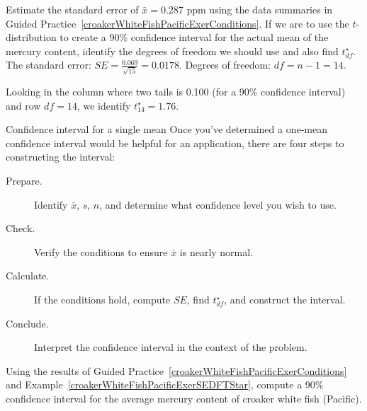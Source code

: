 \begin{examplewrap}
\begin{nexample}{Estimate the standard error of $\bar{x}=0.287$ ppm using the data summaries in Guided Practice~\ref{croakerWhiteFishPacificExerConditions}. If we are to use the $t$-distribution to create a 90\% confidence interval for the actual mean of the mercury content, identify the degrees of freedom we should use and also find $t^{\star}_{df}$.}
\label{croakerWhiteFishPacificExerSEDFTStar}
The standard error: $SE = \frac{0.069}{\sqrt{15}} = 0.0178$. Degrees of freedom: $df = n - 1 = 14$.

Looking in the column where two tails is 0.100 (for a 90\% confidence interval) and row $df=14$, we identify $t^{\star}_{14} = 1.76$.
\end{nexample}
\end{examplewrap}

\begin{onebox}{Confidence interval for a single mean}
  Once you've determined a one-mean confidence interval
  would be helpful for an application,
  there are four steps to constructing the interval:
  \begin{description}
  \item[Prepare.]
      Identify $\bar{x}$, $s$, $n$, and determine what
      confidence level you wish to use.
  \item[Check.]
      Verify the conditions to ensure $\bar{x}$
      is nearly normal.
  \item[Calculate.]
      If the conditions hold, compute $SE$,
      find $t_{df}^{\star}$, and construct the interval.
  \item[Conclude.]
      Interpret the confidence interval in the context
      of the problem.
  \end{description}
\end{onebox}

\begin{exercisewrap}
\begin{nexercise}
Using the results of Guided Practice~\ref{croakerWhiteFishPacificExerConditions} and Example~\ref{croakerWhiteFishPacificExerSEDFTStar}, compute a 90\% confidence interval for the average mercury content of croaker white fish (Pacific).\footnotemark{}
\end{nexercise}
\end{exercisewrap}

